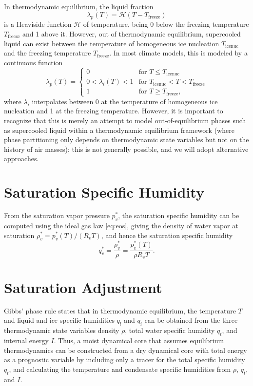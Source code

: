 \documentclass{report}
\begin{document}
In thermodynamic equilibrium, the liquid fraction 
\begin{equation}\label{e:liquid_fraction}
    \lambda_p(T) = \mathcal{H}(T-T_{\mathrm{freeze}})
\end{equation} 
is a Heaviside function $\mathcal{H}$ of temperature, being 0 below the freezing temperature $T_{\mathrm{freeze}}$ and 1 above it. However, out of thermodynamic equilibrium, supercooled liquid can exist between the temperature of homogeneous ice nucleation $T_{\mathrm{icenuc}}$ and the freezing temperature $T_{\mathrm{freeze}}$. In most climate models, this is modeled by a continuous function 
\begin{equation}
    \lambda_p(T) = 
    \begin{cases}
    0 & \text{for } T\le T_{\mathrm{icenuc}}\\
    0<\lambda_i(T)<1 & \text{for } T_{\mathrm{icenuc}} < T <  T_{\mathrm{freeze}}\\
    1   & \text{for } T\ge T_{\mathrm{freeze}},
    \end{cases}
\end{equation} 
where $\lambda_i$ interpolates between 0 at the temperature of homogeneous ice nucleation and 1 at the freezing temperature. However, it is important to recognize that this is merely an attempt to model out-of-equilibrium phases such as supercooled liquid within a thermodynamic equilibrium framework (where phase partitioning only depends on thermodynamic state variables but not on the history of air masses); this is not generally possible, and we will adopt alternative approaches.

\section{Saturation Specific Humidity}
\label{sct:sat_spef_hum}
From the saturation vapor pressure $p_v^*$, the saturation specific humidity can be computed using the ideal gas law \eqref{eq:eos}, giving the density of water vapor at saturation $\rho_v^* = p_v^*(T)/(R_v T)$, and hence the saturation specific humidity 
\begin{equation}\label{eq:sat_shum}
     q_v^* = \frac{\rho_v^*}{\rho} = \frac{p_v^*(T)}{\rho R_v T}.
\end{equation}

\section{Saturation Adjustment}
\label{sct:sat_adj}
Gibbs' phase rule states that in thermodynamic equilibrium, the temperature $T$ and liquid and ice specific humidities $q_l$ and $q_i$ can be obtained from the three thermodynamic state variables density $\rho$, total water specific humidity $q_t$, and internal energy $I$. Thus, a moist dynamical core that assumes equilibrium thermodynamics can be constructed from a dry dynamical core with total energy as a prognostic variable by including only a tracer for the total specific humidity $q_t$, and calculating the temperature and condensate specific humidities from $\rho$, $q_t$, and $I$. 
\end{document}
